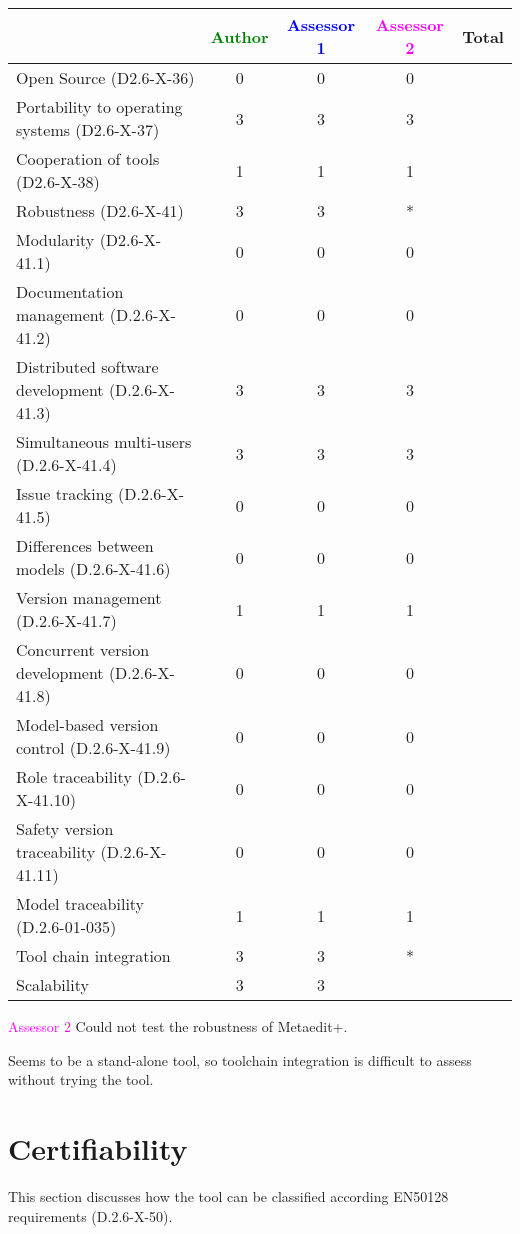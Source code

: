 \begin{tabular}{|l | c | c | c | c|}
\hline
& \textcolor{green}{Author} & \textcolor{blue}{Assessor 1} & \textcolor{magenta}{Assessor 2} & Total \\
\hline 
Open Source (D2.6-X-36) &0 &0 & 0&  \\
\hline 
Portability to operating systems (D2.6-X-37) &3 &3 & 3&  \\
\hline
Cooperation of tools (D2.6-X-38) &1 &1 & 1&  \\
\hline
Robustness (D2.6-X-41) &3 &3 & *& \\
\hline
Modularity (D2.6-X-41.1) &0 &0 & 0& \\
\hline
Documentation management (D.2.6-X-41.2) &0 &0 & 0& \\
\hline
Distributed software development (D.2.6-X-41.3)  &3 &3 & 3& \\
\hline
Simultaneous multi-users (D.2.6-X-41.4)   &3 &3 & 3& \\
\hline
Issue tracking (D.2.6-X-41.5) &0 &0 & 0& \\
\hline
Differences between models (D.2.6-X-41.6) &0 &0 & 0& \\
\hline
Version management (D.2.6-X-41.7) &1 &1 & 1& \\
\hline
Concurrent version development (D.2.6-X-41.8) &0 &0 & 0& \\
\hline
Model-based version control (D.2.6-X-41.9) &0 &0 & 0& \\
\hline
Role traceability (D.2.6-X-41.10) &0 &0 & 0& \\
\hline
Safety version traceability (D.2.6-X-41.11) &0 &0 & 0& \\
\hline
Model traceability (D.2.6-01-035) &1 &1 & 1& \\
\hline
Tool chain integration &3 &3 & *& \\
\hline
Scalability &3 &3 & & \\
\hline
\end{tabular}

\textcolor{magenta}{Assessor 2} Could not test the robustness of Metaedit+.

Seems to be a stand-alone tool, so toolchain integration is difficult to assess
without trying the tool.

\section{Certifiability}

This section discusses how the tool can be classified according EN50128 requirements (D.2.6-X-50).


